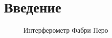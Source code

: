 \documentclass[a4paper,12pt]{article}
\theoremstyle{definition}
\begin{document}
\section{Введение}
\begin{figure}[H]
	\begin{minipage}[h]{0.55\linewidth}
	\end{minipage}
	\begin{minipage}[h]{0.5\linewidth}
	\end{minipage}
  \caption[]{\label{fig:ifp} Интерферометр Фабри-Перо}
\end{figure}
\end{document}

